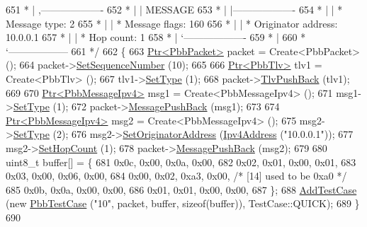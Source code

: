 \begin{DoxyCode}
651 \textcolor{comment}{         * |    ,-------------------}
652 \textcolor{comment}{         * |    |  MESSAGE}
653 \textcolor{comment}{         * |    |-------------------}
654 \textcolor{comment}{         * |    | * Message type:       2}
655 \textcolor{comment}{         * |    | * Message flags:  160}
656 \textcolor{comment}{         * |    | * Originator address: 10.0.0.1}
657 \textcolor{comment}{         * |    | * Hop count:          1}
658 \textcolor{comment}{         * |    `-------------------}
659 \textcolor{comment}{         * |}
660 \textcolor{comment}{         * `------------------}
661 \textcolor{comment}{   */}
662   \{
663     \hyperlink{classns3_1_1Ptr}{Ptr<PbbPacket>} packet = Create<PbbPacket> ();
664     packet->\hyperlink{classns3_1_1PbbPacket_a7d6a1602be86109760d0f26ff9bbbb8e}{SetSequenceNumber} (10);
665 
666     \hyperlink{classns3_1_1Ptr}{Ptr<PbbTlv>} tlv1 = Create<PbbTlv> ();
667     tlv1->\hyperlink{classns3_1_1PbbTlv_a90a0452018ed364ac37c3ad116dd718b}{SetType} (1);
668     packet->\hyperlink{classns3_1_1PbbPacket_a34935793e729a106c176db99c969cb42}{TlvPushBack} (tlv1);
669 
670     \hyperlink{classns3_1_1Ptr}{Ptr<PbbMessageIpv4>} msg1 = Create<PbbMessageIpv4> ();
671     msg1->\hyperlink{classns3_1_1PbbMessage_a4b3d1eaabd3e7412a46ac79bf3360dac}{SetType} (1);
672     packet->\hyperlink{classns3_1_1PbbPacket_a4a3170001ef758d9c9c4375b8f089826}{MessagePushBack} (msg1);
673 
674     \hyperlink{classns3_1_1Ptr}{Ptr<PbbMessageIpv4>} msg2 = Create<PbbMessageIpv4> ();
675     msg2->\hyperlink{classns3_1_1PbbMessage_a4b3d1eaabd3e7412a46ac79bf3360dac}{SetType} (2);
676     msg2->\hyperlink{classns3_1_1PbbMessage_a52ac135a2bec53db5e8f46b8b8a25e7c}{SetOriginatorAddress} (\hyperlink{classns3_1_1Ipv4Address}{Ipv4Address} (\textcolor{stringliteral}{"10.0.0.1"}));
677     msg2->\hyperlink{classns3_1_1PbbMessage_a882ec7e2e9a9dff6297152c196d54ce4}{SetHopCount} (1);
678     packet->\hyperlink{classns3_1_1PbbPacket_a4a3170001ef758d9c9c4375b8f089826}{MessagePushBack} (msg2);
679 
680     uint8\_t buffer[] = \{
681       0x0c, 0x00, 0x0a, 0x00,
682       0x02, 0x01, 0x00, 0x01,
683       0x03, 0x00, 0x06, 0x00,
684       0x00, 0x02, 0xa3, 0x00,     \textcolor{comment}{/* [14] used to be 0xa0 */}
685       0x0b, 0x0a, 0x00, 0x00,
686       0x01, 0x01, 0x00, 0x00,
687     \};
688     \hyperlink{classns3_1_1TestCase_a3718088e3eefd5d6454569d2e0ddd835}{AddTestCase} (\textcolor{keyword}{new} \hyperlink{classPbbTestCase}{PbbTestCase} (\textcolor{stringliteral}{"10"}, packet, buffer, \textcolor{keyword}{sizeof}(buffer)), 
      TestCase::QUICK);
689   \}
690 

\end{DoxyCode}
